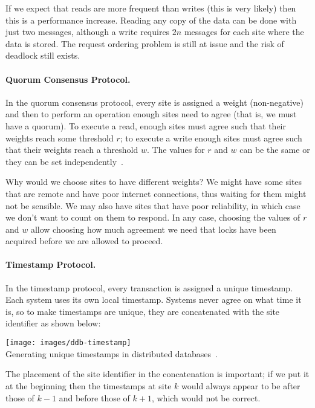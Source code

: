 \documentclass[a4paper]{report}
\begin{document}
If we expect that reads are more frequent than writes (this is very likely) then this is a performance increase. Reading any copy of the data can be done with just two messages, although a write requires $2n$ messages for each site where the data is stored. The request ordering problem is still at issue and the risk of deadlock still exists.

\paragraph{Quorum Consensus Protocol.} In the quorum consensus protocol, every site is assigned a weight (non-negative) and then to perform an operation enough sites need to agree (that is, we must have a quorum). To execute a read, enough sites must agree such that their weights reach some threshold $r$; to execute a write enough sites must agree such that their weights reach a threshold $w$. The values for $r$ and $w$ can be the same or they can be set independently~\cite{dsc}.

Why would we choose sites to have different weights? We might have some sites that are remote and have poor internet connections, thus waiting for them might not be sensible. We may also have sites that have poor reliability, in which case we don't want to count on them to respond. In any case, choosing the values of $r$ and $w$ allow choosing how much agreement we need that locks have been acquired before we are allowed to proceed.

\paragraph{Timestamp Protocol.} In the timestamp protocol, every transaction is assigned a unique timestamp. Each system uses its own local timestamp. Systems never agree on what time it is, so to make timestamps are unique, they are concatenated with the site identifier as shown below:

\begin{center}
\texttt{[image: images/ddb-timestamp]}\\
Generating unique timestamps in distributed databases~\cite{dsc}.
\end{center}

The placement of the site identifier in the concatenation is important; if we put it at the beginning then the timestamps at site $k$ would always appear to be after those of $k-1$ and before those of $k+1$, which would not be correct. 
\end{document}
